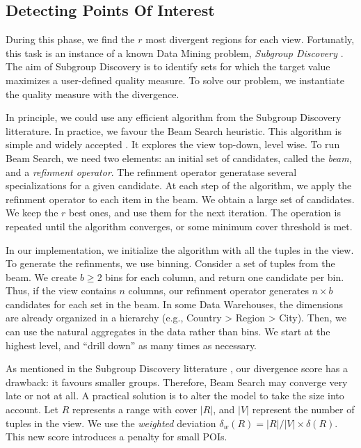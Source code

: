 \subsection{Detecting Points Of Interest}
\label{sec:detec}
During this phase, we find the $r$ most divergent regions for each view.
Fortunatly, this task is an instance of a known Data Mining problem,
\emph{Subgroup Discovery} \cite{klosgen1996explora}\cite{wrobel1997algorithm}.
The aim of Subgroup Discovery is to identify sets for which the target value
maximizes a user-defined quality measure. To solve our problem, we instantiate
the quality measure with the divergence.

In principle, we could use any efficient algorithm from the Subgroup Discovery
litterature.  In practice, we favour the Beam Search heuristic. This algorithm
is simple and widely accepted \cite{van2011non}. It explores the view top-down,
level wise. To run Beam Search, we need two elements: an initial set of
candidates, called the \emph{beam}, and a \emph{refinment operator}. The
refinment operator generatase several specializations for a given candidate. At
each step of the algorithm, we apply the refinment operator to each item in the
beam. We obtain a large set of candidates. We keep the $r$ best ones, and use
them for the next iteration. The operation is repeated until the algorithm
converges, or some minimum cover threshold is met.

In our implementation, we initialize the algorithm with all the tuples in the
view.  To generate the refinments, we use binning.  Consider a set of tuples
from the beam.  We create $b \geq 2$ bins for each column, and return one
candidate per bin. Thus, if the view contains $n$ columns, our refinment
operator generates $n \times b$ candidates for each set in the beam.  In some
Data Warehouses, the dimensions are already organized in a hierarchy (e.g.,
Country > Region > City). Then, we can use the natural aggregates
in the data rather than bins. We start at the highest level, and ``drill down''
as many times as necessary.

As mentioned in the Subgroup Discovery litterature \cite{van2011non}, our
divergence score has a drawback: it favours smaller groups.  Therefore, Beam
Search may converge very late or not at all.  A practical
solution is to alter the model to take the size into account. Let $R$
represents a range with cover $|R|$, and $|V|$ represent the number of tuples
in the view. We use the \emph{weighted} deviation $\delta_w(R) = |R|/|V| \times
\delta(R)$. This new score introduces a penalty for small POIs.


